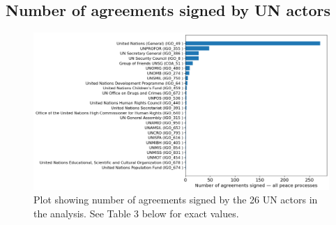 \documentclass{article}
\begin{document}
\subsection{Number of agreements signed by UN actors}


\begin{figure}[H]
\begin{center}
\includegraphics[scale=0.36]{./assets/figure_1.png}
\caption{Plot showing number of agreements signed by the 26 UN actors in the analysis. See Table 3 below for exact values.}
\end{center}
\end{figure}
\end{document}
